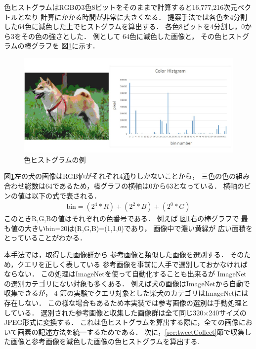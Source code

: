 \documentclass{deimj}
\begin{document}
色ヒストグラムはRGBの3色8ビットをそのままで計算すると16,777,216次元ベクトルとなり
計算にかかる時間が非常に大きくなる．
提案手法では各色を4分割した64色に減色した上でヒストグラムを算出する．
各色8ビットを4分割し，0から3をその色の強さとした．
例として
64色に減色した画像と，
その色ヒストグラムの棒グラフを
図\ref{fig:color}に示す．
%
\begin{figure}[tb]
 \begin{center}
  \includegraphics[scale=0.28]{colorhist.jpg}
 \end{center}
 \caption{色ヒストグラムの例}
 \label{fig:color}
\end{figure}
%
%
図\ref{fig:color}左の犬の画像はRGB値がそれぞれ4通りしかないことから，
三色の色の組み合わせ総数は64であるため，棒グラフの横軸は0から63となっている．
横軸のビンの値は以下の式で表される．
\begin{eqnarray}
\mbox{bin} = (2^4 * R) + (2^2 * B) + (2^0 * G)
\end{eqnarray}
このときR,G,Bの値はそれぞれの色番号である．
例えば
図\ref{fig:color}右の棒グラフで
最も値の大きいbin=20は(R,G,B)=(1,1,0)であり，
画像中で濃い黄緑が
広い面積をとっていることがわかる．

本手法では，取得した画像群から
参考画像と類似した画像を選別する．
そのため，クエリを正しく表している
参考画像を事前に人手で選別しておかなければならない．
この処理はImageNetを使って自動化することも出来るが
ImageNetの選別カテゴリにない対象も多くある．
例えば犬の画像はImageNetから自動で収集できるが，
4
節の実験でクエリ対象とした柴犬のカテゴリはImageNetには存在しない．
この様な場合もあるため本実装では参考画像の選別は手動処理としている．
%
選別された参考画像と収集した画像群は全て同じ320$\times$240サイズのJPEG形式に変換する．
これは色ヒストグラムを算出する際に，全ての画像において画素の記述方法を統一するためである．
次に，\ref{sec:tweetCollect}節で収集した画像と参考画像を減色した画像の色ヒストグラムを算出する.
\end{document}
